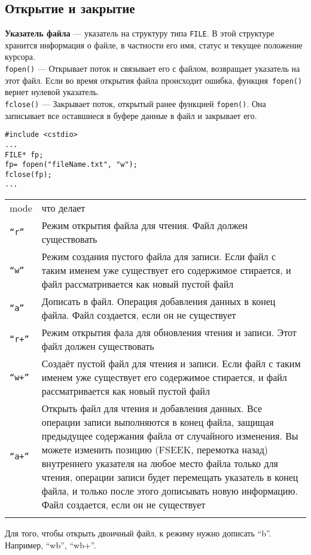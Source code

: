 \documentclass {article}
\begin{document}
\subsection{Открытие и закрытие}
{\bfseries Указатель файла} --- указатель на структуру типа \texttt{FILE}. В этой структуре хранится информация о файле, в частности его имя, статус и текущее положение курсора. \\
\texttt{fopen()} --- Открывает поток и связывает его с файлом, возвращает указатель на этот файл. Если во время открытия файла происходит ошибка, функция\texttt{ fopen()} вернет нулевой указатель.\\
\texttt{fclose()} --- Закрывает поток, открытый ранее функцией \texttt{fopen()}. Она записывает все оставшиеся в буфере данные в файл и закрывает его.
\begin{lstlisting}
#include <cstdio>
...
FILE* fp;
fp= fopen("fileName.txt", "w");
fclose(fp);
...
\end{lstlisting}
\begin{center}
\begin{tabular}{p{1 cm} p{14cm} }
\rowcolor[rgb]{0.8,0.2,0.2} mode & что делает \\\tabrowsep
\rowcolor[rgb]{0.7,0.7,0.7} \texttt{``r''} & Режим открытия файла для чтения. Файл должен существовать   \\\tabrowsep
\rowcolor[rgb]{0.7,0.7,0.7} \texttt{``w''} & 
Режим создания пустого файла для записи. Если файл с таким именем уже существует его содержимое стирается, и файл рассматривается как новый пустой файл  \\\tabrowsep
\rowcolor[rgb]{0.7,0.7,0.7} \texttt{``a''} & Дописать в файл. Операция добавления данных в конец файла. Файл создается, если он не существует   \\\tabrowsep
\rowcolor[rgb]{0.7,0.7,0.7} \texttt{``r+''} &  Режим открытия фала для обновления чтения и записи. Этот файл должен существовать  \\\tabrowsep
\rowcolor[rgb]{0.7,0.7,0.7} \texttt{``w+''} &  Создаёт пустой файл для чтения и записи. Если файл с таким именем уже существует его содержимое стирается, и файл рассматривается как новый пустой файл \\\tabrowsep
\rowcolor[rgb]{0.7,0.7,0.7} \texttt{``a+''} &   Открыть файл для чтения и добавления данных. Все операции записи выполняются в конец файла, защищая предыдущее содержания файла от случайного изменения. Вы можете изменить позицию (FSEEK, перемотка назад) внутреннего указателя на любое место файла только для чтения, операции записи будет перемещать указатель в конец файла, и только после этого дописывать новую информацию. Файл создается, если он не существует \\\tabrowsep
\end{tabular}
\end{center}
Для того, чтобы открыть двоичный файл, к режиму нужно дописать ``b''. Например, ``wb'', ``wb+''.
\end{document}
